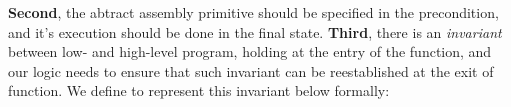 \textbf{Second}, the abtract assembly primitive should be 
specified in the precondition, and it's execution 
should be done in the final state. 
\textbf{Third}, there is an {\it invariant}   
between low- and high-level program, holding at the entry of 
the function, and our logic needs to ensure that such invariant 
can be reestablished at the exit of function.  
% 
We define \INV{} to represent this invariant below formally: 
